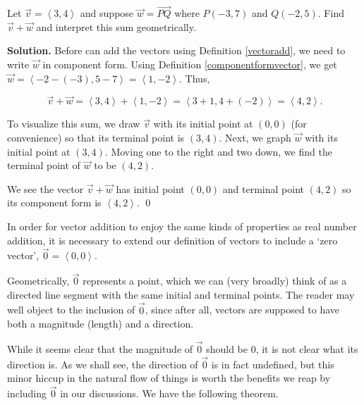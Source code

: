 \documentclass{ximera}
\begin{document}
\begin{example}  \label{vectoraddex}  Let  $\overrightarrow{v} = \left<3,4\right>$ and suppose  $\overrightarrow{w} = \overrightarrow{PQ}$ where $P(-3,7)$ and $Q(-2,5)$.  Find $\overrightarrow{v} + \overrightarrow{w}$ and interpret this sum geometrically.

\medskip

{\bf Solution.}  Before can add the vectors using Definition \ref{vectoradd}, we need to write  $\overrightarrow{w}$ in component form. Using Definition \ref{componentformvector}, we get $\overrightarrow{w} = \left<-2-(-3),5-7\right> = \left<1,-2\right>$.  Thus,

  \[\overrightarrow{v} + \overrightarrow{w} =  \left<3,4\right> + \left<1,-2\right> =  \left< 3 + 1, 4 + (-2) \right> =  \left<4, 2\right>. \]
                                        
To visualize this sum, we draw $\overrightarrow{v}$ with its initial point at $(0,0)$ (for convenience) so that its terminal point is $(3,4)$.  Next, we graph $\overrightarrow{w}$ with its initial point at $(3,4)$.  Moving one to the right and two down, we find the terminal point of $\overrightarrow{w}$ to be $(4,2)$.  

\begin{center} 
\end{center}

We see the vector $\overrightarrow{v} + \overrightarrow{w}$ has initial point $(0,0)$ and terminal point $(4,2)$ so its component form  is $\left<4,2\right>$. \qed

\end{example}

In order for vector addition to enjoy the same kinds of properties as real number addition, it is necessary to extend our definition of vectors to include a `zero vector', $\overrightarrow{0} = \left<0, 0\right>$.  

Geometrically,  $\overrightarrow{0}$ represents a point, which we can (very broadly) think of as a directed line segment with the same initial and terminal points.  The reader may well object to the inclusion of $\overrightarrow{0}$, since after all, vectors are supposed to have both a magnitude (length) and a direction.

While it seems clear that the magnitude of $\overrightarrow{0}$ should be $0$, it is not clear what its direction is.  As we shall see, the direction of $\overrightarrow{0}$ is in fact undefined, but this minor hiccup in the natural flow of things is worth the benefits we reap by including $\overrightarrow{0}$ in our discussions.  We have the following theorem.
\end{document}
